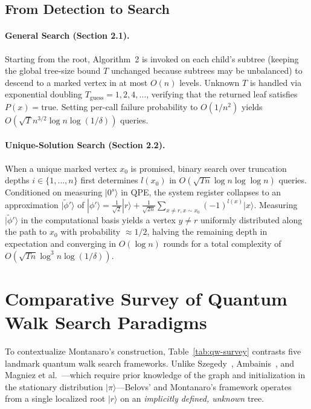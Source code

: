 \documentclass[11pt,a4paper]{article}
\begin{document}
\subsection{From Detection to Search}
\paragraph{General Search (Section 2.1).}
Starting from the root, Algorithm~2 is invoked on each child's subtree (keeping the global tree-size bound $T$ unchanged because subtrees may be unbalanced) to descend to a marked vertex in at most $O(n)$ levels. Unknown $T$ is handled via exponential doubling $T_{\text{guess}} = 1, 2, 4, \dots$, verifying that the returned leaf satisfies $P(x) = \text{true}$. Setting per-call failure probability to $O(1/n^2)$ yields $O(\sqrt{T} n^{3/2} \log n \log(1/\delta))$ queries.

\paragraph{Unique-Solution Search (Section 2.2).}
When a unique marked vertex $x_0$ is promised, binary search over truncation depths $i \in \{1, \dots, n\}$ first determines $l(x_0)$ in $O(\sqrt{Tn}\log n \log\log n)$ queries. Conditioned on measuring $|0^s\rangle$ in QPE, the system register collapses to an approximation $|\tilde{\phi}'\rangle$ of $|\phi'\rangle = \frac{1}{\sqrt{2}}|r\rangle + \frac{1}{\sqrt{2n}}\sum_{x \neq r, x \sim x_0} (-1)^{l(x)}|x\rangle$. Measuring $|\tilde{\phi}'\rangle$ in the computational basis yields a vertex $y \neq r$ uniformly distributed along the path to $x_0$ with probability $\approx 1/2$, halving the remaining depth in expectation and converging in $O(\log n)$ rounds for a total complexity of $O(\sqrt{Tn}\log^3 n \log(1/\delta))$.

\section{Comparative Survey of Quantum Walk Search Paradigms}

To contextualize Montanaro's construction, Table~\ref{tab:qw-survey} contrasts five landmark quantum walk search frameworks. Unlike Szegedy~\cite{szegedy2004}, Ambainis~\cite{ambainis2004}, and Magniez et al.~\cite{magniez2011}---which require prior knowledge of the graph and initialization in the stationary distribution $|\pi\rangle$---Belovs' and Montanaro's framework operates from a single localized root $|r\rangle$ on an \emph{implicitly defined, unknown} tree.
\end{document}
